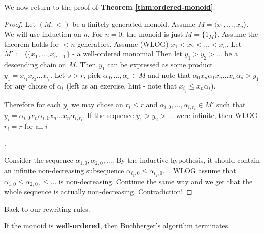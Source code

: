 \smallLine
We now return to the proof of \textbf{Theorem \ref{thm:ordered-monoid}}.
\begin{proof}
    Let $(M, <)$ be a finitely generated monoid.
    Assume $M = \langle{x_1,\ldots, x_n}\rangle$.
    We will use induction on $n$.
    For $n=0$, the monoid is just $M = \{1_M\}$.
    Assume the theorem holds for $<n$ generators.
    Assume (WLOG) $x_1< x_2 < \ldots < x_n$.
    Let $M' := \langle\{x_1,\ldots, x_{n-1}\}$ - a well-ordered monomial
    Then let $y_1 > y_2 > \ldots $ be a descending chain on $M$.
    Then $y_1$ can be expressed as some product 
    $y_1 = x_{i_1}x_{i_2}\ldots x_{i_{r}}$.
    Let $s > r$, pick $\alpha_0, \ldots, \alpha_s \in M$ 
    and note that $\alpha_0 x_n \alpha_1 x_n \ldots x_n\alpha_s > y_1$
    for any choise of $\alpha_i$ (left as an exercise,
    hint - note that $x_{i_j} \leq x_n \alpha_i$).

    Therefore for each $y_i$ we may chose 
    an $r_i \leq r$ and $\alpha_{i, 0}, \ldots, \alpha_{i, r_i} \in M'$
    such that $y_i = \alpha_{i,0}x_n \alpha_{i, 1}x_n \ldots x_n\alpha_{i, r_i}$.
    If the sequence $y_1 > y_2 > \ldots$ were infinite, 
    then WLOG $r_i = r$ for all $i$ 

    .

    Consider the sequence $\alpha_{1, 0}, \alpha_{2, 0}, \ldots$.
    By the inductive hypothesis, it should contain an infinite 
    non-decreasing subsequence
    $\alpha_{i_1, 0} \leq \alpha_{i_2, 0} \ldots$.
    WLOG assume that $\alpha_{1, 0}\leq  \alpha_{2, 0}, \leq \ldots $
    is non-decreasing.
    Continue the same way and we get that the whole sequence is actually
    non-decreasing. Contradiction!    

\end{proof}

Back to our rewriting rules. 
\begin{Theorem}
If the monoid is \textbf{well-ordered}, then Buchberger's algorithm
terminates. 
\end{Theorem}

